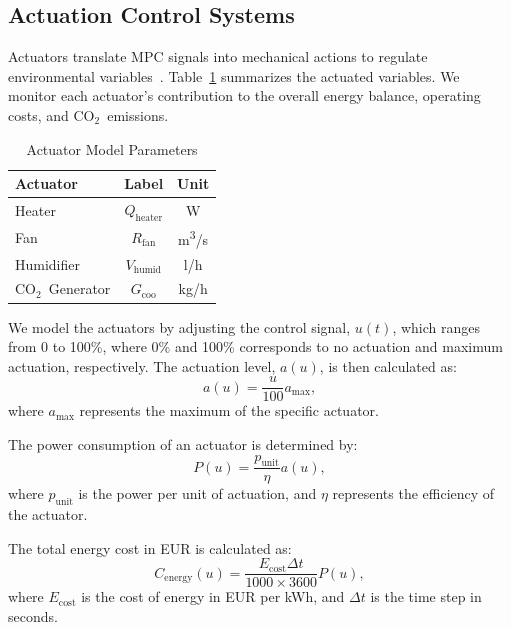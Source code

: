 \documentclass[conference]{IEEEtran}
\newcommand{\ui}[2]{#1_{\mathrm{#2}}}
\newcommand{\coo}{\ensuremath{\mathrm{CO_2}}}
\begin{document}
\subsection{Actuation Control Systems}
Actuators translate MPC signals into mechanical actions to regulate environmental variables~\cite{Butterfield2018}. Table~\ref{tab:actuators} summarizes the actuated variables. We monitor each actuator's contribution to the overall energy balance, operating costs, and \coo\ emissions.
\begin{table}
    \centering
    \caption{Actuator Model Parameters}\label{tab:actuators}
    \begin{tabular}{lcc}
        \toprule
        Actuator        & Label                & Unit                   \\
        \midrule
        Heater          & \( \ui{Q}{heater} \) & W                      \\
        Fan             & \( \ui{R}{fan} \)    & m\textsuperscript{3}/s \\
        Humidifier      & \( \ui{V}{humid} \)  & l/h                    \\
        \coo\ Generator & \( \ui{G}{coo} \)    & kg/h                   \\
        \bottomrule
    \end{tabular}
\end{table}
We model the actuators by adjusting the control signal, \( u(t) \), which ranges from 0 to 100\%, where 0\% and 100\% corresponds to no actuation and maximum actuation, respectively. The actuation level, \( a(u) \), is then calculated as:
\begin{equation}
    a(u) = \frac{u}{100}  \ui{a}{max},
\end{equation}
where \( \ui{a}{max} \) represents the maximum of the specific actuator.

The power consumption of an actuator is determined by:
\begin{equation}
    P(u) = \frac{\ui{p}{unit}}{\eta}  a(u),
\end{equation}
where \( \ui{p}{unit} \) is the power per unit of actuation, and \( \eta \) represents the efficiency of the actuator.

The total energy cost in EUR is calculated as:
\begin{equation}
    \ui{C}{energy}(u) = \frac{\ui{E}{cost}  \Delta t}{1000 \times 3600}  P(u),
\end{equation}
where \( \ui{E}{cost} \) is the cost of energy in EUR per kWh, and \( \Delta t \) is the time step in seconds.
\end{document}
